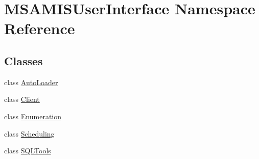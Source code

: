 \hypertarget{namespace_m_s_a_m_i_s_user_interface}{}\section{M\+S\+A\+M\+I\+S\+User\+Interface Namespace Reference}
\label{namespace_m_s_a_m_i_s_user_interface}
\subsection*{Classes}
\begin{DoxyCompactItemize}
\item 
class \hyperlink{class_m_s_a_m_i_s_user_interface_1_1_auto_loader}{Auto\+Loader}
\item 
class \hyperlink{class_m_s_a_m_i_s_user_interface_1_1_client}{Client}
\item 
class \hyperlink{class_m_s_a_m_i_s_user_interface_1_1_enumeration}{Enumeration}
\item 
class \hyperlink{class_m_s_a_m_i_s_user_interface_1_1_scheduling}{Scheduling}
\item 
class \hyperlink{class_m_s_a_m_i_s_user_interface_1_1_s_q_l_tools}{S\+Q\+L\+Tools}
\end{DoxyCompactItemize}
